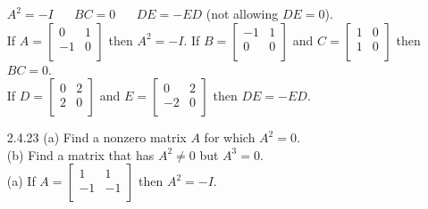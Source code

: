 \documentclass[10pt,twoside,reqno]{article}
\begin{document}
\begin{enumerate}
\hspace{35pt}
$ A^2=-I \hspace{20pt} BC=0 \hspace{20pt} DE = -ED$ (not allowing $DE = 0$). \\
\vspace{3mm}
\hspace{20pt}If 
$
$$
A=
\begin{bmatrix}
0&1 \\
-1&0 \\
\end{bmatrix}
$$
$
then $A^2=-I$.
\hspace{15pt}If 
$
$$
B=
\begin{bmatrix}
-1&1 \\
0&0 \\
\end{bmatrix}
$$
$
 and 
$
$$
C=
\begin{bmatrix}
1&0 \\
1&0 \\
\end{bmatrix}
$$
$
 then $BC=0$. \\
\hspace{80pt}If 
$
$$
D=
\begin{bmatrix}
0&2 \\
2&0 \\
\end{bmatrix}
$$
$
 and 
$
$$
E=
\begin{bmatrix}
0&2 \\
-2&0 \\
\end{bmatrix}
$$
$
 then $DE=-ED$.
\vspace{3mm}
\item[2.4.23]\hspace{10pt}(a) Find a nonzero matrix $A$ for which $A^2=0$. \\
\hspace{10pt}(b) Find a matrix that has $A^2 \neq 0$ but $A^3 = 0$. \\
\vspace{3mm}
\hspace{10pt}(a) If 
$
$$
A=
\begin{bmatrix}
1&1 \\
-1&-1 \\
\end{bmatrix}
$$
$
 then $A^2=-I$. \\

\end{enumerate}
\end{document}
